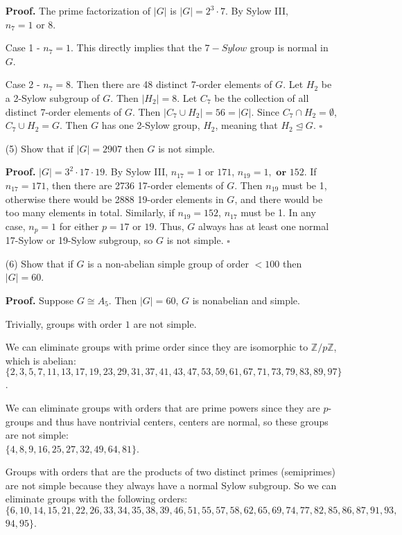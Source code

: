 \documentclass[11pt]{article}
\newcommand {\Z}{\mathbb{Z}}
\begin{document}
\begin{enumerate}
    \textbf{Proof.} The prime factorization of $|G|$ is $|G| = 2^3 \cdot 7$. By Sylow III, $n_7 = 1 \text{ or } 8$.

    Case 1 - $n_7 = 1$. This directly implies that the $7-Sylow$ group is normal in $G$.

    Case 2 - $n_7 = 8$. Then there are 48 distinct 7-order elements of $G$. Let $H_2$ be a 2-Sylow subgroup of $G$. Then $|H_2| = 8$. Let $C_7$ be the collection of all distinct 7-order elements of $G$. Then $|C_7 \cup H_2| = 56 = |G|$. Since $C_7 \cap H_2 = \emptyset$, $C_7 \cup H_2 = G$. Then $G$ has one 2-Sylow group, $H_2$, meaning that $H_2 \trianglelefteq G$. $\square$

    \item [(5)] Show that if $|G| = 2907$ then $G$ is not simple.

    \textbf{Proof.} $|G| = 3^2 \cdot 17 \cdot 19$. By Sylow III, $n_{17} = 1 \text{ or } 171$, $n_{19} = 1, \textbf{ or } 152$. If $n_{17} = 171$, then there are 2736 17-order elements of $G$. Then $n_{19}$ must be 1, otherwise there would be 2888 19-order elements in $G$, and there would be too many elements in total. Similarly, if $n_{19} = 152$, $n_{17}$ must be 1. In any case, $n_p = 1$ for either $p = 17 \text{ or } 19$. Thus, $G$ always has at least one normal 17-Sylow or 19-Sylow subgroup, so $G$ is not simple. $\square$ 

    \item [(6)] Show that if $G$ is a non-abelian simple group of order $< 100$ then $|G| = 60$. 

    \textbf{Proof.} Suppose $G \cong A_5$. Then $|G| = 60$, $G$ is nonabelian and simple. 
    
    Trivially, groups with order $1$ are not simple.
    
    We can eliminate groups with prime order since they are isomorphic to $\Z/p\Z$, which is abelian: \\ $\{2, 3, 5, 7, 11, 13, 17, 19, 23, 29, 31, 37, 41, 43, 47, 53, 59, 61, 67, 71, 73, 79, 83, 89, 97\}$.

    We can eliminate groups with orders that are prime powers since they are $p$-groups and thus have nontrivial centers, centers are normal, so these groups are not simple:\\ $\{ 4, 8, 9, 16,  25, 27, 32, 49, 64, 81\}$.

    Groups with orders that are the products of two distinct primes (semiprimes) are not simple because they always have a normal Sylow subgroup. So we can eliminate groups with the following orders: \\ $\{ 6, 10, 14, 15, 21, 22, 26, 33, 34, 35, 38, 39, 46, 51, 55, 57, 58, 62, 65, 69, 74, 77, 82, 85, 86, 87, 91, 93, $\\
    $94, 95\}$.


\end{enumerate}
\end{document}
